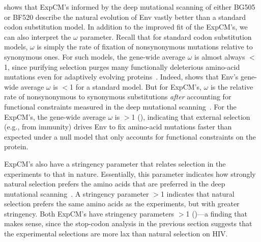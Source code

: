 \documentclass[9pt]{elife}
\begin{document}
 shows that ExpCM's informed by the deep mutational scanning of either BG505 or BF520 describe the natural evolution of Env vastly better than a standard codon substitution model.
In addition to the improved fit of the ExpCM's, we can also interpret the $\omega$ parameter.
Recall that for standard codon substitution models, $\omega$ is simply the rate of fixation of nonsynonymous mutations relative to synonymous ones.
For such models, the gene-wide average $\omega$ is almost always $<$1, since purifying selection purges many functionally deleterious amino-acid mutations even for adaptively evolving proteins~\citep{murrell2015gene}.
Indeed,  shows that Env's gene-wide average $\omega$ is $<$1 for a standard model.
But for ExpCM's, $\omega$ is the relative rate of nonsynonymous to synonymous substitutions \emph{after} accounting for functional constraints measured in the deep mutational scanning~\citep{bloom2017identification}.
For the ExpCM's, the gene-wide average $\omega$ is $>$1 (), indicating that external selection (e.g., from immunity) drives Env to fix amino-acid mutations faster than expected under a null model that only accounts for functional constraints on the protein.

ExpCM's also have a stringency parameter that relates selection in the experiments to that in nature.
Essentially, this parameter indicates how strongly natural selection prefers the amino acids that are preferred in the deep mutational scanning~\citep{hilton2017phydms}.
A stringency parameter $>$1 indicates that natural selection prefers the same amino acids as the experiments, but with greater stringency.
Both ExpCM's have stringency parameters $>$1 ()---a finding that makes sense, since the stop-codon analysis in the previous section suggests that the experimental selections are more lax than natural selection on HIV.
\end{document}
